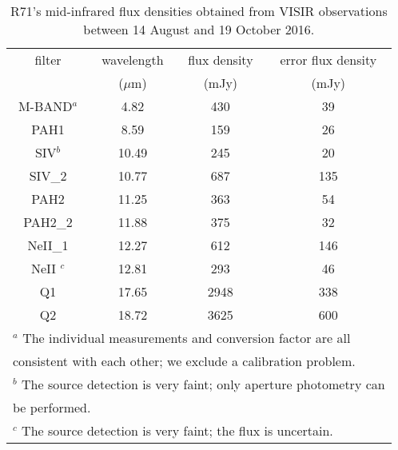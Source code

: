 \documentclass[structabstract]{aa}
\begin{document}
\begin{table}
\caption{R71's mid-infrared flux densities obtained from VISIR observations between 14 August and 19 October 2016.\label{table:mid-infrared}}
\begin{tabular}{cccc}
\hline\hline
filter & wavelength & flux density & error flux density \\ %
	&  ($\mu$m) & (mJy) & (mJy) \\
	\hline
M-BAND$^a$	&	4.82		&	430	&	39	 \\
PAH1		&	8.59	 &	159	&	26	 \\
SIV$^b$	&	10.49	&	245	&	20 \\
SIV\_2	&	10.77	&	687	&	135 \\
PAH2	&	11.25	&	363	&	54	 \\
PAH2\_2	&	11.88	&	375	&	32 \\
NeII\_1	&	12.27	&	612	&	146 \\
NeII	$^c$	&	12.81	&	293	&	46 \\
Q1	&	17.65	&	2948		&	338 \\
Q2	&	18.72	&	3625		&	600	 \\
\hline
\multicolumn{4}{l}{$^a$ The individual measurements and conversion factor are all} \\
\multicolumn{4}{l}{\phantom{$^b$}  consistent with each other; we exclude a calibration problem.} \\
\multicolumn{4}{l}{$^b$ The source detection is very faint; only aperture photometry can} \\
\multicolumn{4}{l}{\phantom{$^b$} be performed.} \\
\multicolumn{4}{l}{$^c$ The source detection is very faint; the flux is uncertain.} \\
\end{tabular}
\end{table}
\end{document}
